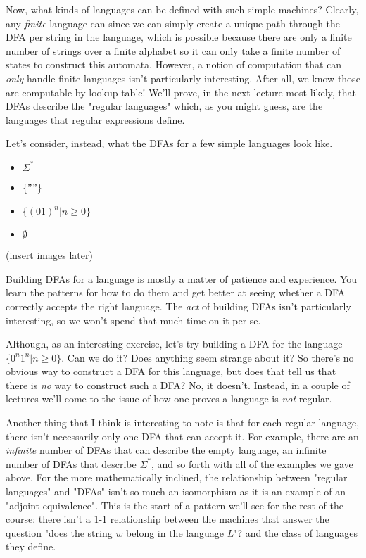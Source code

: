 \documentclass[11pt]{article}
\begin{document}
Now, what kinds of languages can be defined with such simple machines? Clearly, any \emph{finite} language can since we can simply create a unique path through the DFA per string in the language, which is possible because there are only a finite number of strings over a finite alphabet so it can only take a finite number of states to construct this automata. However, a notion of computation that can \emph{only} handle finite languages isn't particularly interesting. After all, we know those are computable by lookup table! We'll prove, in the next lecture most likely, that DFAs describe the "regular languages" which, as you might guess, are the languages that regular expressions define. 

Let's consider, instead, what the DFAs for a few simple languages look like.
\begin{itemize}
\item $\Sigma^*$
\item $\{""\}$
\item $\{(01)^n | n \geq 0\}$
\item $\emptyset$
\end{itemize}
(insert images later)

Building DFAs for a language is mostly a matter of patience and experience. You learn the patterns for how to do them and get better at seeing whether a DFA correctly accepts the right language. The \emph{act} of building DFAs isn't particularly interesting, so we won't spend that much time on it per se.

Although, as an interesting exercise, let's try building a DFA for the language $\{0^n1^n | n \geq 0\}$. Can we do it? Does anything seem strange about it? So there's no obvious way to construct a DFA for this language, but does that tell us that there is \emph{no} way to construct such a DFA? No, it doesn't. Instead, in a couple of lectures we'll come to the issue of how one proves a language is \emph{not} regular.

Another thing that I think is interesting to note is that for each regular language, there isn't necessarily only one DFA that can accept it. For example, there are an \emph{infinite} number of DFAs that can describe the empty language, an infinite number of DFAs that describe $\Sigma^*$, and so forth with all of the examples we gave above. For the more mathematically inclined, the relationship between "regular languages" and "DFAs" isn't so much an isomorphism as it is an example of an "adjoint equivalence". This is the start of a pattern we'll see for the rest of the course: there isn't a 1-1 relationship between the machines that answer the question "does the string $w$ belong in the language $L$"? and the class of languages they define.
\end{document}
